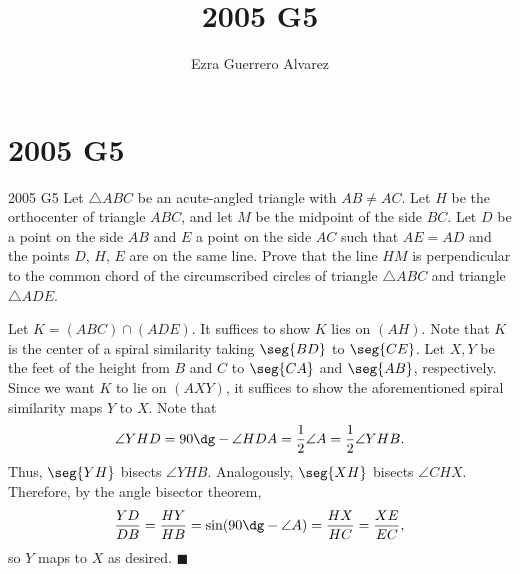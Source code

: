 \documentclass[14pt]{article}
\title{2005 G5}
\author{Ezra Guerrero Alvarez}
\begin{document}
\maketitle
	
\section*{2005 G5}

\begin{statement}{2005 G5}
	Let $\triangle ABC$ be an acute-angled triangle with $AB \not= AC$. Let $H$ be the orthocenter of triangle $ABC$, and let $M$ be the midpoint of the side $BC$. Let $D$ be a point on the side $AB$ and $E$ a point on the side $AC$ such that $AE=AD$ and the points $D$, $H$, $E$ are on the same line. Prove that the line $HM$ is perpendicular to the common chord of the circumscribed circles of triangle $\triangle ABC$ and triangle $\triangle ADE$.
\end{statement}
Let $K=(ABC)\cap(ADE)$. It suffices to show $K$ lies on $(AH)$. Note that $K$ is the center of a spiral similarity taking $\seg{BD}$ to $\seg{CE}$. Let $X,Y$ be the feet of the height from $B$ and $C$ to $\seg{CA}$ and $\seg{AB}$, respectively. Since we want $K$ to lie on $(AXY)$, it suffices to show the aforementioned spiral similarity maps $Y$ to $X$. Note that
\[ \angle YHD = 90\dg-\angle HDA = \frac12\angle A=\frac12\angle YHB. \]
Thus, $\seg{YH}$ bisects $\angle YHB$. Analogously, $\seg{XH}$ bisects $\angle CHX$. Therefore, by the angle bisector theorem,
\[ \frac{YD}{DB}=\frac{HY}{HB}=\sin(90\dg-\angle A)=\frac{HX}{HC}=\frac{XE}{EC}, \]
so $Y$ maps to $X$ as desired. $\blacksquare$
	
\end{document}
